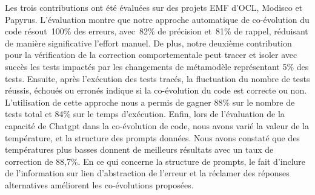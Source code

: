 {{	Les trois contributions ont été évaluées sur des projets EMF d'OCL, Modisco et Papyrus. L'évaluation montre que notre approche automatique de co-évolution du code résout~100\% des erreurs, avec~82\% de précision et~81\% de rappel, réduisant de manière significative l'effort manuel.
	De plus, notre deuxième contribution pour la vérification de la correction comportementale peut tracer et isoler avec succès les tests impactés par les changements de métamodèle représentant 5\% des tests. Ensuite, après l'exécution des tests tracés, la fluctuation du nombre de tests réussis, échoués ou erronés indique si la co-évolution du code est correcte ou non. L'utilisation de cette approche nous a permis de gagner 88\% sur le nombre de tests total et 84\% sur le temps d'exécution. Enfin, lors de l'évaluation de la capacité de Chatgpt dans la co-évolution de code, nous avons varié la valeur de la température, et la structure des prompts données. Nous avons constaté que des températures plus basses donnent de meilleurs résultats avec un taux de correction de 88,7\%. En ce qui concerne la structure de prompts, le fait d'inclure de l'information sur lien d'abstraction de l'erreur et la réclamer des réponses alternatives améliorent les co-évolutions proposées.
	
	
}





}
